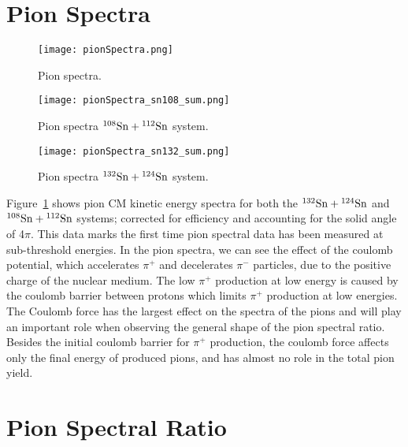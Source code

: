 \section{Pion Spectra}
\label{sec:pionSpectra}



\begin{figure}[!htb]
\centering
\texttt{[image: pionSpectra.png]}
\caption{Pion spectra. }
\label{fig:pionspectra}
\end{figure}


\begin{figure}[!htb]
\centering
\texttt{[image: pionSpectra\_sn108\_sum.png]}
\caption{Pion spectra ${}^{108}\mathrm{Sn} + {}^{112}\mathrm{Sn}$ system. }
\label{fig:pionspectraSn108}
\end{figure}


\begin{figure}[!htb]
\centering
\texttt{[image: pionSpectra\_sn132\_sum.png]}
\caption{Pion spectra ${}^{132}\mathrm{Sn} + {}^{124}\mathrm{Sn}$ system. }
\label{fig:pionspectraSn132}
\end{figure}


Figure~\ref{fig:pionspectra} shows pion CM kinetic energy spectra for both the ${}^{132}\mathrm{Sn} + {}^{124}\mathrm{Sn}$ and ${}^{108}\mathrm{Sn} + {}^{112}\mathrm{Sn}$ systems; corrected for efficiency and accounting for the solid angle of 4$\pi$. This data marks the first time pion spectral data has been measured at sub-threshold energies. In the pion spectra, we can see the effect of the coulomb potential, which accelerates $\pi^+$ and decelerates $\pi^-$ particles, due to the positive charge of the nuclear medium. The low $\pi^+$ production at low energy is caused by the coulomb barrier between protons which limits $\pi^+$ production at low energies. The Coulomb force has the largest effect on the spectra of the pions and will play an important role when observing the general shape of the pion spectral ratio. Besides the initial coulomb barrier for $\pi^+$ production, the coulomb force affects only the final energy of produced pions, and has almost no role in the total pion yield. 












\section{Pion Spectral Ratio}



